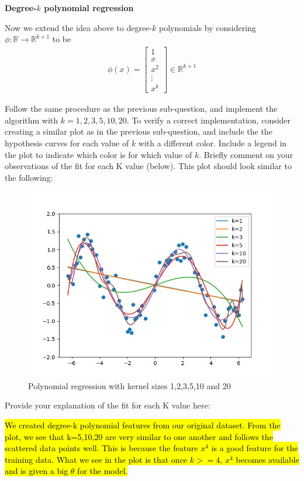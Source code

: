 \item {} {\bf Degree-$k$ polynomial regression}

Now we extend the idea above to degree-$k$ polynomials by considering $\phi:\mathbb{R}\rightarrow \mathbb{R}^{k+1}$ to be 
		\begin{align}
	\phi(x) = \left[\begin{array}{c} 1\\ x \\ x^2\\ \vdots \\x^k \end{array}\right]\in \mathbb{R}^{k+1} \label{eqn:feature-k}
	\end{align}

Follow the same procedure as the previous sub-question, and implement the algorithm with $k=1,2,3,5,10,20$. To verify a correct implementation, consider creating a similar plot as in the previous sub-question, and include the the hypothesis curves for each value of $k$ with a different color. Include a legend in the plot to indicate which color is for which value of $k$.  Briefly comment on your observations of the fit for each K value (below).  This plot should look similar to the following:
\begin{figure}[H]
  \centering
  \includegraphics[width=0.65\linewidth]{featuremaps/src/large-poly.png}
  \centering
\caption{Polynomial regression with kernel sizes 1,2,3,5,10 and 20}
\end{figure}

Provide your explanation of the fit for each K value here:

\hl{We created degree-k polynomial features from our original dataset. From the plot, we see that k=5,10,20 are very similar to one another and follows the scattered data points well. This is because the feature $x^4$ is a good feature for the training data. What we see in the plot is that once $k>=4$, $x^4$ becomes available and is given a big $\theta$ for the model.}
\\[50pt]